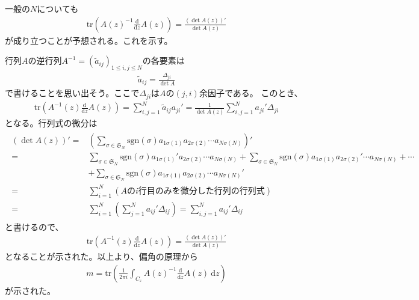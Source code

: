\documentclass{jsarticle}
\def\diff{\textrm{d}}
\begin{document}
一般の$N$についても
\begin{align}
\mathrm{tr}\left(A(z)^{-1}\frac{\diff}{\diff z}A(z)\right)=\frac{\left(\det A(z)\right)'}{\det A(z)}
\end{align}
が成り立つことが予想される。これを示す。

行列$A$の逆行列$A^{-1}=(\tilde{a}_{ij})_{1\leq i,j\leq N}$の各要素は
\begin{align}
\tilde{a}_{ij}=\frac{\Delta_{ji}}{\det A}
\end{align}
で書けることを思い出そう。ここで$\Delta_{ji}$は$A$の$(j,i)$余因子である。
このとき、
\begin{align}
\mathrm{tr}\left(A^{-1}(z)\frac{\diff}{\diff z}A(z)\right)
=\sum_{i,j=1}^{N}\tilde{a}_{ij}a_{ji}'
=\frac{1}{\det A(z)}\sum_{i,j=1}^{N}a_{ji}'\Delta_{ji}
\end{align}
となる。行列式の微分は
\begin{align*}
\begin{aligned}
    \left(\det A(z)\right)'=&\left(\sum_{\sigma\in\mathfrak{S}_{N}}\mathrm{sgn}(\sigma)a_{1\sigma(1)}a_{2\sigma(2)}\cdots a_{N\sigma(N)}\right)'\\
    =&\sum_{\sigma\in\mathfrak{S}_{N}}\mathrm{sgn}(\sigma)a_{1\sigma(1)}'a_{2\sigma(2)}\cdots a_{N\sigma(N)}
    +\sum_{\sigma\in\mathfrak{S}_{N}}\mathrm{sgn}(\sigma)a_{1\sigma(1)}a_{2\sigma(2)}'\cdots a_{N\sigma(N)}+\cdots\\
    &+\sum_{\sigma\in\mathfrak{S}_{N}}\mathrm{sgn}(\sigma)a_{1\sigma(1)}a_{2\sigma(2)}\cdots a_{N\sigma(N)}'\\
    =&\sum_{i=1}^{N}(A\mathrm{の}i\mathrm{行目のみを微分した行列の行列式})\\
    =&\sum_{i=1}^{N}\left(\sum_{j=1}^{N}a_{ij}'\Delta_{ij}\right)
    =\sum_{i,j=1}^{N}a_{ij}'\Delta_{ij}
\end{aligned}
\end{align*}
と書けるので、
\begin{align}
\mathrm{tr}\left(A^{-1}(z)\frac{\diff}{\diff z}A(z)\right)=\frac{\left(\det A(z)\right)'}{\det A(z)}
\end{align}
となることが示された。以上より、偏角の原理から
\begin{align}
    m=\mathrm{tr}\left(\frac{1}{2\pi i}\int_{C_{\varepsilon}}A(z)^{-1}\frac{\diff}{\diff z}A(z)~\diff z\right)
\end{align}
が示された。
\end{document}
